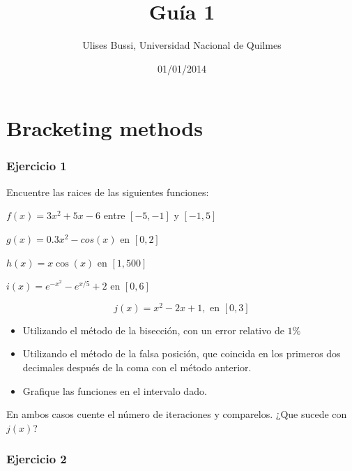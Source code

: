 \documentclass[a4paper,11pt]{article}
\makeatletter
\theoremstyle{mytheor}
\renewcommand{\maketitle}{
\colorbox{gray!20}{\framebox[\linewidth]{ \huge \textsc{\@title} } 
\lfoot{\@title}
}

}
\makeatother
\begin{document}
\title{Guía 1}

\author{Ulises Bussi, Universidad Nacional de Quilmes}

\date{01/01/2014}

\maketitle \vspace{20pt}

\section{Bracketing methods}
%
\subsubsection*{Ejercicio 1}

Encuentre las raices de las siguientes funciones:

\begin{enumerate}
\begin{minipage}{.6\linewidth}
\item $f(x) = 3x^2 + 5x -6$ entre $[-5,-1]$ y $[-1,5]$
\item $g(x) = 0.3x^2 -cos(x)$ en $[0,2]$
\end{minipage}\begin{minipage}{.4\linewidth}
\item $h(x) = x\cos(x)$ en $[1,500]$
\item $i(x) = e^{-x^2} -e^{x/5}+2$ en $[0,6]$
\end{minipage}
$$j(x) = x^2 -2x +1, \text{ en } [0,3]$$


\begin{itemize}
\item Utilizando el método de la bisección, con un error relativo de $1\%$
\item Utilizando el método de la falsa posición, que coincida en los primeros dos decimales después de la coma con el método anterior.  
\item Grafique las funciones en el intervalo dado.
\end{itemize}
En ambos casos cuente el número de iteraciones y comparelos. ¿Que sucede con $j(x)$?

\end{enumerate}

\subsubsection*{Ejercicio 2}
\end{document}

